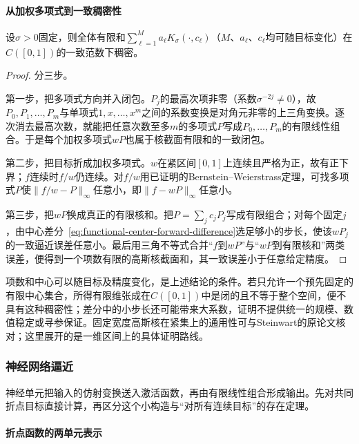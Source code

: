 \paragraph{从加权多项式到一致稠密性}

\begin{theorem}[固定宽度高斯核截面的一致稠密性]
设$\sigma>0$固定，则全体有限和$\sum_{\ell=1}^{M}a_\ell K_\sigma(\cdot,c_\ell)$（$M$、$a_\ell$、$c_\ell$均可随目标变化）在$C([0,1])$的一致范数下稠密。
\end{theorem}

\begin{proof}
分三步。

第一步，把多项式方向并入闭包。$P_j$的最高次项非零（系数$\sigma^{-2j}\ne0$），故$P_0,P_1,\ldots,P_m$与单项式$1,x,\ldots,x^m$之间的系数变换是对角元非零的上三角变换。逐次消去最高次数，就能把任意次数至多$m$的多项式$P$写成$P_0,\ldots,P_m$的有限线性组合。于是每个加权多项式$wP$也属于核截面有限和的一致闭包。

第二步，把目标折成加权多项式。$w$在紧区间$[0,1]$上连续且严格为正，故有正下界；$f$连续时$f/w$仍连续。对$f/w$用已证明的Bernstein--Weierstrass定理，可找多项式$P$使$\|f/w-P\|_\infty$任意小，即$\|f-wP\|_\infty$任意小。

第三步，把$wP$换成真正的有限核和。把$P=\sum_j c_jP_j$写成有限组合；对每个固定$j$，由中心差分~\eqref{eq:functional-center-forward-difference}选足够小的步长，使该$wP_j$的一致逼近误差任意小。最后用三角不等式合并“$f$到$wP$”与“$wP$到有限核和”两类误差，便得到一个项数有限的高斯核截面和，其一致误差小于任意给定精度。
\end{proof}

项数和中心可以随目标及精度变化，是上述结论的条件。若只允许一个预先固定的有限中心集合，所得有限维张成在$C([0,1])$中是闭的且不等于整个空间，便不具有这种稠密性；差分中的小步长还可能带来大系数，证明不提供统一的规模、数值稳定或寻参保证。固定宽度高斯核在紧集上的通用性可与Steinwart的原论文核对；这里展开的是一维区间上的具体证明路线。

\subsubsection{神经网络逼近}
\label{subsubsec:neural-network-approximation}

神经单元把输入的仿射变换送入激活函数，再由有限线性组合形成输出。先对共同折点目标直接计算，再区分这个小构造与“对所有连续目标”的存在定理。

\paragraph{折点函数的两单元表示}

